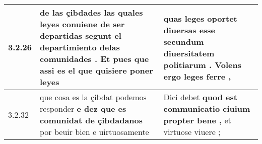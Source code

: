 \begin{tabular}{|p{1cm}|p{6.5cm}|p{6.5cm}|}
3.2.26 & de las çibdades las quales leyes conuiene de ser departidas \textbf{ segunt el departimiento delas comunidades . } Et pues que assi es el que quisiere poner leyes & quas leges oportet diuersas esse \textbf{ secundum diuersitatem politiarum . } Volens ergo leges ferre , \\\hline
3.2.32 & que cosa es la çibdat podemos responder \textbf{ e dez que es comunidat de çibdadanos } por beuir bien e uirtuosamente & Dici debet \textbf{ quod est communicatio ciuium propter bene , } et virtuose viuere ; \\\hline

\end{tabular}
